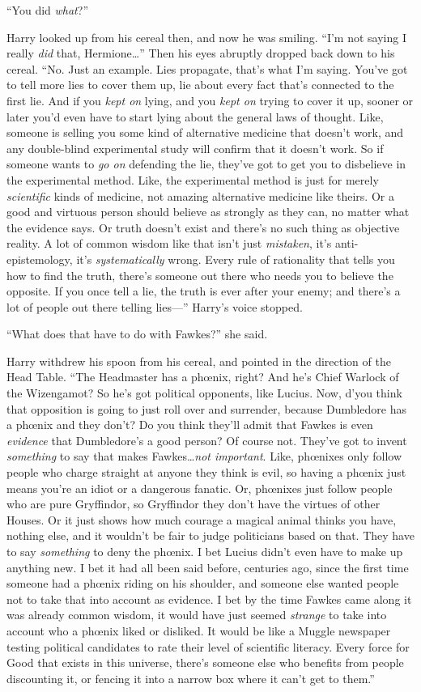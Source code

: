 “You did \emph{what}?”

Harry looked up from his cereal then, and now he was smiling. “I’m not saying I really \emph{did} that, Hermione…” Then his eyes abruptly dropped back down to his cereal. “No. Just an example. Lies propagate, that’s what I’m saying. You’ve got to tell more lies to cover them up, lie about every fact that’s connected to the first lie. And if you \emph{kept on} lying, and you \emph{kept on} trying to cover it up, sooner or later you’d even have to start lying about the general laws of thought. Like, someone is selling you some kind of alternative medicine that doesn’t work, and any double-blind experimental study will confirm that it doesn’t work. So if someone wants to \emph{go on} defending the lie, they’ve got to get you to disbelieve in the experimental method. Like, the experimental method is just for merely \emph{scientific} kinds of medicine, not amazing alternative medicine like theirs. Or a good and virtuous person should believe as strongly as they can, no matter what the evidence says. Or truth doesn’t exist and there’s no such thing as objective reality. A lot of common wisdom like that isn’t just \emph{mistaken}, it’s anti-epistemology, it’s \emph{systematically} wrong. Every rule of rationality that tells you how to find the truth, there’s someone out there who needs you to believe the opposite. If you once tell a lie, the truth is ever after your enemy; and there’s a lot of people out there telling lies—” Harry’s voice stopped.

“What does that have to do with Fawkes?” she said.

Harry withdrew his spoon from his cereal, and pointed in the direction of the Head Table. “The Headmaster has a phœnix, right? And he’s Chief Warlock of the Wizengamot? So he’s got political opponents, like Lucius. Now, d’you think that opposition is going to just roll over and surrender, because Dumbledore has a phœnix and they don’t? Do you think they’ll admit that Fawkes is even \emph{evidence} that Dumbledore’s a good person? Of course not. They’ve got to invent \emph{something} to say that makes Fawkes…\emph{not important}. Like, phœnixes only follow people who charge straight at anyone they think is evil, so having a phœnix just means you’re an idiot or a dangerous fanatic. Or, phœnixes just follow people who are pure Gryffindor, so Gryffindor they don’t have the virtues of other Houses. Or it just shows how much courage a magical animal thinks you have, nothing else, and it wouldn’t be fair to judge politicians based on that. They have to say \emph{something} to deny the phœnix. I bet Lucius didn’t even have to make up anything new. I bet it had all been said before, centuries ago, since the first time someone had a phœnix riding on his shoulder, and someone else wanted people not to take that into account as evidence. I bet by the time Fawkes came along it was already common wisdom, it would have just seemed \emph{strange} to take into account who a phœnix liked or disliked. It would be like a Muggle newspaper testing political candidates to rate their level of scientific literacy. Every force for Good that exists in this universe, there’s someone else who benefits from people discounting it, or fencing it into a narrow box where it can’t get to them.”

